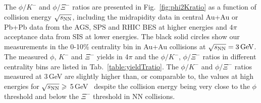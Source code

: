 \documentclass[aps,tightenlines,superscriptaddress,twocolumn]{revtex4-1}
\begin{document}
The $\phi/K^-$ and $\phi/\Xi^-$ ratios are presented in Fig.~\ref{fig:phi2Kratio} as a function of collision energy $\sqrt{s_{\rm NN}}$, including the midrapidity data in central Au+Au or Pb+Pb data from the AGS, SPS and RHIC BES at higher energies and $4\pi$\,acceptance data from SIS at lower energies. The black solid circles show our measurements in the 0-10\% centrality bin in Au+Au collisions at ${\sqrt{s_{\rm NN}} = \rm{3\,GeV}}$. The measured $\phi$, $K^-$ and $\Xi^-$ yields in 4$\pi$ and the $\phi/K^-$, $\phi/\Xi^-$ ratios in different centrality bins are listed in Tab.~\ref{table:yieldTratio}. The $\phi/K^-$ and $\phi/\Xi^-$ ratios measured at 3\,GeV are slightly higher than, or comparable to, the values at high energies for $\sqrt{s_{\rm NN}} \geqslant$ 5\,GeV~\cite{NA49_piK2:2002,E917_phi:2004,NA49_phi:2008,NA49_piK:2008,NA49_Xi:2008,STAR_phi_64a200GeV:2009,Xi_ArKCl_HADES:2009,ALICE_phi_2p7TeV:2015,star_bes_strangeness:2020} despite the collision energy being very close to the $\phi$ threshold and below the $\Xi^-$ threshold in NN collisions. 
\end{document}

